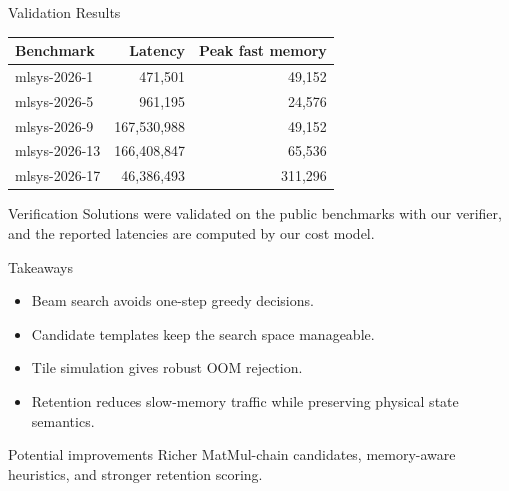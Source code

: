 \documentclass[aspectratio=169,professionalfonts]{beamer}
\begin{document}
\begin{frame}{Validation Results}
\begin{table}
\centering
\small
\begin{tabular}{lrr}
\toprule
Benchmark & Latency & Peak fast memory \\
\midrule
mlsys-2026-1 & 471,501 & 49,152 \\
mlsys-2026-5 & 961,195 & 24,576 \\
mlsys-2026-9 & 167,530,988 & 49,152 \\
mlsys-2026-13 & 166,408,847 & 65,536 \\
mlsys-2026-17 & 46,386,493 & 311,296 \\
\bottomrule
\end{tabular}
\end{table}
\begin{block}{Verification}
Solutions were validated on the public benchmarks with our verifier, and the reported latencies are computed by our cost model.
\end{block}
\end{frame}

\begin{frame}{Takeaways}
\begin{itemize}
\item Beam search avoids one-step greedy decisions.
\item Candidate templates keep the search space manageable.
\item Tile simulation gives robust OOM rejection.
\item Retention reduces slow-memory traffic while preserving physical state semantics.
\end{itemize}
\begin{block}{Potential improvements}
Richer MatMul-chain candidates, memory-aware heuristics, and stronger retention scoring.
\end{block}
\end{frame}
\end{document}
